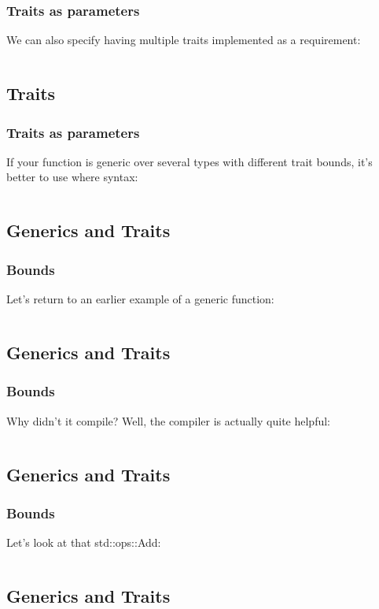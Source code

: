 \documentclass[usenames,twocolumn,dvipsnames,10pt,a4wide]{article}
\begin{document}
	\subsubsection{Traits as parameters}
	We can also specify having multiple traits
	implemented as a requirement:
	\inputminted[fontsize=\normalsize]{rust}{code/traits4.rs}


\subsection{Traits}
	\subsubsection{Traits as parameters}
	If your function is generic over several types with
	different trait bounds, it's better to use where syntax:	
	\inputminted[fontsize=\normalsize]{rust}{code/traits5.rs}


\subsection{Generics and Traits}
	\subsubsection{Bounds}
	Let's return to an earlier example of a generic function:
	\inputminted[fontsize=\normalsize]{rust}{code/generics5.rs}


\subsection{Generics and Traits}
	\subsubsection{Bounds}
	Why didn't it compile? Well, the compiler is actually quite helpful:
	\inputminted[fontsize=\normalsize]{rust}{code/generics6.rs}


\subsection{Generics and Traits}
	\subsubsection{Bounds}
	Let's look at that std::ops::Add:
	\inputminted[fontsize=\normalsize]{rust}{code/generics7.rs}


\subsection{Generics and Traits}
\end{document}
